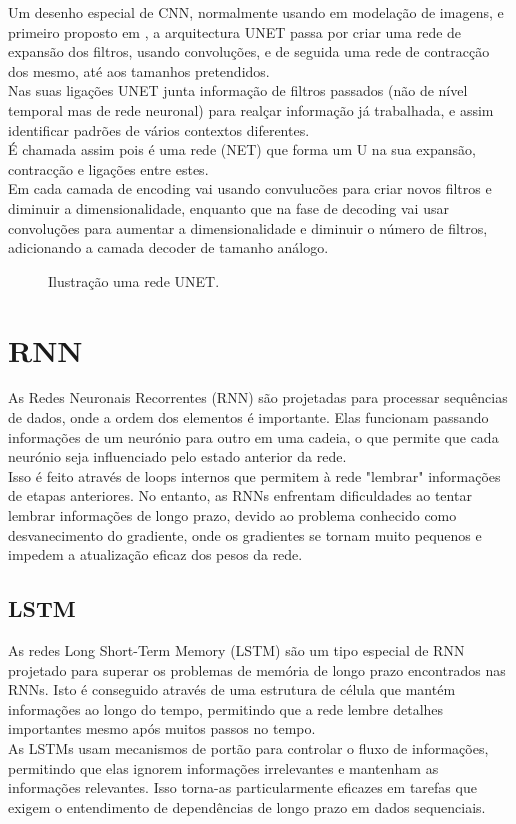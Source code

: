 Um desenho especial de CNN, normalmente usando em modelação de imagens, e primeiro proposto em \cite{Shelhamer2014}, a arquitectura UNET passa por criar uma rede de expansão dos filtros, usando convoluções, e de seguida uma rede de contracção dos mesmo, até aos tamanhos pretendidos.\\
Nas suas ligações UNET junta informação de filtros passados (não de nível temporal mas de rede neuronal) para realçar informação já trabalhada, e assim identificar padrões de vários contextos diferentes.\\
É chamada assim pois é uma rede (NET) que forma um U na sua expansão, contracção e ligações entre estes.\\
Em cada camada de encoding vai usando convulucões para criar novos filtros e diminuir a dimensionalidade, enquanto que na fase de decoding vai usar convoluções para aumentar a dimensionalidade e diminuir o número de filtros, adicionando a camada decoder de tamanho análogo.\\

\begin{figure}[H]
	\centering
	\resizebox{\linewidth}{!}{}
	\caption{Ilustração uma rede UNET.}
	\label{fig:unet_graph}
\end{figure}


\section{RNN\label{se:rnn_sec}}

As Redes Neuronais Recorrentes (RNN) são projetadas para processar sequências de dados, onde a ordem dos elementos é importante. Elas funcionam passando informações de um neurónio para outro em uma cadeia, o que permite que cada neurónio seja influenciado pelo estado anterior da rede.\\
Isso é feito através de loops internos que permitem à rede "lembrar" informações de etapas anteriores. No entanto, as RNNs enfrentam dificuldades ao tentar lembrar informações de longo prazo, devido ao problema conhecido como desvanecimento do gradiente, onde os gradientes se tornam muito pequenos e impedem a atualização eficaz dos pesos da rede.\\

\subsection{LSTM\label{se:lstms_sec}}

As redes Long Short-Term Memory (LSTM) são um tipo especial de RNN projetado para superar os problemas de memória de longo prazo encontrados nas RNNs. Isto é conseguido através de uma estrutura de célula que mantém informações ao longo do tempo, permitindo que a rede lembre detalhes importantes mesmo após muitos passos no tempo.\\
As LSTMs usam mecanismos de portão para controlar o fluxo de informações, permitindo que elas ignorem informações irrelevantes e mantenham as informações relevantes. Isso torna-as particularmente eficazes em tarefas que exigem o entendimento de dependências de longo prazo em dados sequenciais.\\



